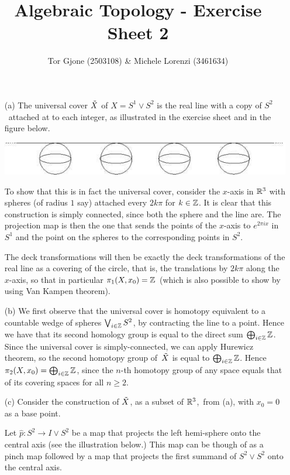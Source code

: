 \documentclass[a4paper,11pt,english]{article}
\title{\textbf{Algebraic Topology} - Exercise Sheet 2}
\author{Tor Gjone (2503108) \& Michele Lorenzi (3461634)}
\begin{document}
\mmaketitle

\begin{exercise}[1]

\begin{enumerate}
\item[(a)]
The universal cover $\tilde X$ of $X=S^1\vee S^2$ is the 
real line with a copy of $S^2$ attached at to each integer, as illustrated in the exercise sheet and in the figure below.
\begin{center}
    \includegraphics[scale=0.6]{img-000.jpg}
\end{center}

To show that this is in fact the universal cover, consider the $x$-axis in $\mathbb{R}^3$ with spheres (of radius $1$ say) attached every $2k\pi$ for $k\in\mathbb{Z}$. It is clear that this construction is simply connected, since both the sphere and the line are. The projection map is then the one that sends the points of the $x$-axis to $e^{2\pi ix}$ in $S^1$ and the point on the spheres to the corresponding points in $S^2$. 

The deck transformations will then be exactly the deck transformations of the real line as a covering of the circle, that is, the translations by $2k\pi$ along the $x$-axis, so that in particular $\pi_1(X,x_0)=\mathbb{Z}$ (which is also possible to show by using Van Kampen theorem).

\item[(b)] We first observe that the universal cover is homotopy equivalent to a countable wedge of spheres $\bigvee_{i\in\mathbb{Z}}S^2$, by contracting the line to a point. Hence we have that its second homology group is equal to the direct sum $\bigoplus_{i\in\mathbb{Z}}\mathbb{Z}$. Since the universal cover is simply-connected, we can apply Hurewicz theorem, so the second homotopy group of $\tilde X$ is equal to $\bigoplus_{i\in\mathbb{Z}}\mathbb{Z}$. Hence $\pi_2(X,x_0)=\bigoplus_{i\in\mathbb{Z}}\mathbb{Z}$, since the $n$-th homotopy group of any space equals that of its covering spaces for all $n \ge 2$.

\item[(c)] 
Consider the construction of $\tilde X$, as a subset of $\mathbb{R}^3$, from (a), with $x_0 = 0$ as a base point.

Let $\hat p: S^2 \to I \vee S^2$ be a map that projects the left hemi-sphere onto the central axis (see the illustration below.) This map can be though of as a pinch map followed by a map that projects the first summand of $S^2 \vee S^2$ onto the central axis.


\end{enumerate}
\end{exercise}
\end{document}

